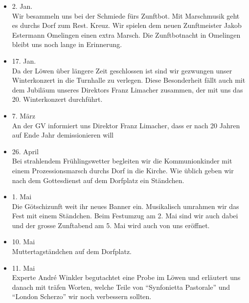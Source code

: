 \begin{multicols}{2}


    \begin{itemize}

        \item[]2. Jan.\\
        Wir besammeln uns bei der Schmiede fürs Zunftbot. Mit Marschmusik geht
        es durchs Dorf zum Rest. Kreuz. Wir spielen dem neuen Zunftmeister Jakob
        Estermann Omelingen einen extra Marsch. Die Zunftbotnacht in Omelingen
        bleibt uns noch lange in Erinnerung.

        \item[]17. Jan.\\
        Da der Löwen über längere Zeit geschlossen ist sind wir gezwungen unser
        Winterkonzert in die Turnhalle zu verlegen. Diese Besonderheit fällt
        auch mit dem Jubiläum unseres Direktors Franz Limacher zusammen, der mit
        uns das 20. Winterkonzert durchführt.

        \item[]7. März\\
        An der GV informiert uns Direktor Franz Limacher, dass er nach 20 Jahren
        auf Ende Jahr demissionieren will

        \item[]26. April\\
        Bei strahlendem Frühlingswetter begleiten wir die Kommunionkinder mit
        einem Prozessionsmarsch durchs Dorf in die Kirche. Wie üblich geben wir
        nach dem Gottesdienst auf dem Dorfplatz ein Ständchen.

        \item[]1. Mai\\
        Die Götschizunft weit ihr neues Banner ein. Musikalisch umrahmen wir das
        Fest mit einem Ständchen. Beim Festumzug am 2. Mai sind wir auch dabei
        und der grosse Zunftabend am 5. Mai wird auch von uns eröffnet.

        \item[]10. Mai\\
        Muttertagständchen auf dem Dorfplatz.

        \item[]11. Mai\\
        Experte André Winkler begutachtet eine Probe im Löwen und erläutert uns
        danach mit träfen Worten, welche Teile von "`Synfonietta Pastorale"' und
        "`London Scherzo"' wir noch verbessern sollten.


\end{itemize}
\end{multicols}
